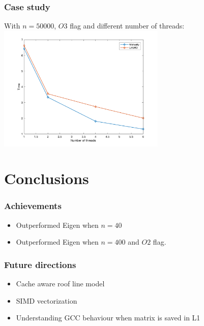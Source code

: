 \documentclass{beamer}
\begin{document}
\begin{frame}
\frametitle{Case study}
With $n = 50000$, $O3$ flag and different number of threads: 
\includegraphics[width=8cm, height=6cm]{graficotimes}
\end{frame}

\section{Conclusions}

\begin{frame}
\frametitle{Achievements}
\begin{itemize}
 \item<1-> Outperformed Eigen when $n = 40$
 \item<2-> Outperformed Eigen when $n = 400$ and $O2$ flag.
\end{itemize}
 \end{frame}
 
\begin{frame}
\frametitle{Future directions}

\begin{itemize}
 \item<1-> Cache aware roof line model
 \item<2-> SIMD vectorization
 \item<3-> Understanding GCC behaviour when matrix is saved in L1
\end{itemize}
\end{frame}
\end{document}
